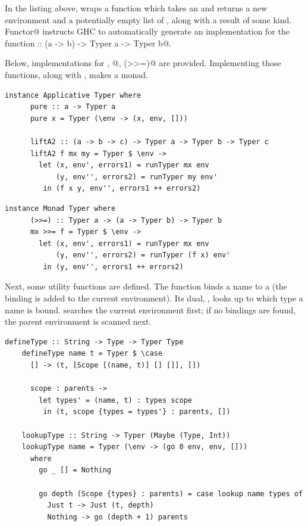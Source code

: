 \documentclass[UdineBachThesis,american,11pt]{PhdThesis}
\begin{document}
  In the listing above, \lstinline@Typer@ wraps a function which takes an
  \lstinline@Environment@ and returns a new environment and a potentially empty
  list of \lstinline@Error@s, along with a result of some kind.
  \lstinline@deriving Functor@ instructs GHC to automatically generate an
  implementation for the function
  \lstinline@fmap :: (a -> b) -> Typer a -> Typer b@.

  Below, implementations for \lstinline@pure@, @,
  \lstinline@(>>=)@ are provided. Implementing those functions, along with
  \lstinline@fmap@, makes \lstinline@Typer@ a monad.

  \begin{lstlisting}[gobble=4,basicstyle=\ttfamily\small]
    instance Applicative Typer where
      pure :: a -> Typer a
      pure x = Typer (\env -> (x, env, []))

      liftA2 :: (a -> b -> c) -> Typer a -> Typer b -> Typer c
      liftA2 f mx my = Typer $ \env ->
        let (x, env', errors1) = runTyper mx env
            (y, env'', errors2) = runTyper my env'
         in (f x y, env'', errors1 ++ errors2)
  \end{lstlisting}

  \newpage

  \begin{lstlisting}[gobble=4,basicstyle=\ttfamily\small]
    instance Monad Typer where
      (>>=) :: Typer a -> (a -> Typer b) -> Typer b
      mx >>= f = Typer $ \env ->
        let (x, env', errors1) = runTyper mx env
            (y, env'', errors2) = runTyper (f x) env'
         in (y, env'', errors1 ++ errors2)
  \end{lstlisting}

  Next, some utility functions are defined. The function \lstinline@defineType@
  binds a name to a \lstinline@Type@ (the binding is added to the current
  environment). Its dual, \lstinline@lookupType@, looks up to which type a name
  is bound. \lstinline@lookupType@ searches the current environment first; if no
  bindings are found, the parent environment is scanned next.

  \begin{lstlisting}[gobble=4,basicstyle=\ttfamily\small]
    defineType :: String -> Type -> Typer Type
    defineType name t = Typer $ \case
      [] -> (t, [Scope [(name, t)] [] []], [])

      scope : parents ->
        let types' = (name, t) : types scope
         in (t, scope {types = types'} : parents, [])

    lookupType :: String -> Typer (Maybe (Type, Int))
    lookupType name = Typer (\env -> (go 0 env, env, []))
      where
        go _ [] = Nothing

        go depth (Scope {types} : parents) = case lookup name types of
          Just t -> Just (t, depth)
          Nothing -> go (depth + 1) parents
  \end{lstlisting}
\end{document}
